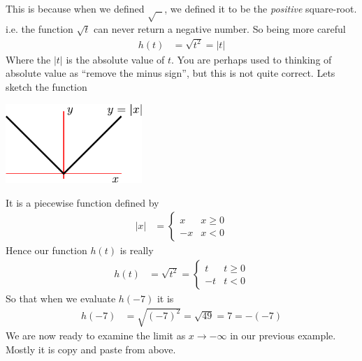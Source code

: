 This is because when we defined $\sqrt{\text{ }}$, we defined it to be the
\emph{positive} square-root. i.e. the function $\sqrt{t}$ can never return a
negative number. So being more careful
\begin{align*}
  h(t) &= \sqrt{t^2} = | t |
\end{align*}
Where the $|t|$ is the absolute value of $t$. You are perhaps used to thinking
of absolute value as ``remove the minus sign'', but this is not quite correct.
Lets sketch the function
\begin{fig}
\begin{center}
\includegraphics[height=3cm]{abs}
\end{center}
\end{fig}
It is a piecewise function defined by
\begin{align*}
  |x| &= \begin{cases}
          x & x \geq 0\\
	  -x & x < 0
         \end{cases}
\end{align*}
Hence our function $h(t)$ is really
\begin{align*}
  h(t) &= \sqrt{t^2} =
	  \begin{cases}
          t & t \geq 0\\
	  -t & t < 0
         \end{cases}
\end{align*}
So that when we evaluate $h(-7)$ it is
\begin{align*}
  h(-7) &= \sqrt{ (-7)^2 } = \sqrt{49} = 7 = -(-7)
\end{align*}
We are now ready to examine the limit as $x \to -\infty$ in our previous
example. Mostly it is copy and paste from above.
